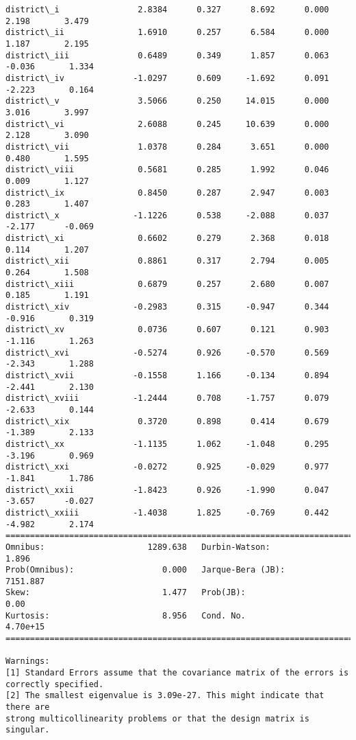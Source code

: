 \documentclass[11pt]{article}
\begin{document}
\begin{Verbatim}[commandchars=\\\{\}]
district\_i                2.8384      0.327      8.692      0.000       2.198       3.479
district\_ii               1.6910      0.257      6.584      0.000       1.187       2.195
district\_iii              0.6489      0.349      1.857      0.063      -0.036       1.334
district\_iv              -1.0297      0.609     -1.692      0.091      -2.223       0.164
district\_v                3.5066      0.250     14.015      0.000       3.016       3.997
district\_vi               2.6088      0.245     10.639      0.000       2.128       3.090
district\_vii              1.0378      0.284      3.651      0.000       0.480       1.595
district\_viii             0.5681      0.285      1.992      0.046       0.009       1.127
district\_ix               0.8450      0.287      2.947      0.003       0.283       1.407
district\_x               -1.1226      0.538     -2.088      0.037      -2.177      -0.069
district\_xi               0.6602      0.279      2.368      0.018       0.114       1.207
district\_xii              0.8861      0.317      2.794      0.005       0.264       1.508
district\_xiii             0.6879      0.257      2.680      0.007       0.185       1.191
district\_xiv             -0.2983      0.315     -0.947      0.344      -0.916       0.319
district\_xv               0.0736      0.607      0.121      0.903      -1.116       1.263
district\_xvi             -0.5274      0.926     -0.570      0.569      -2.343       1.288
district\_xvii            -0.1558      1.166     -0.134      0.894      -2.441       2.130
district\_xviii           -1.2444      0.708     -1.757      0.079      -2.633       0.144
district\_xix              0.3720      0.898      0.414      0.679      -1.389       2.133
district\_xx              -1.1135      1.062     -1.048      0.295      -3.196       0.969
district\_xxi             -0.0272      0.925     -0.029      0.977      -1.841       1.786
district\_xxii            -1.8423      0.926     -1.990      0.047      -3.657      -0.027
district\_xxiii           -1.4038      1.825     -0.769      0.442      -4.982       2.174
==============================================================================
Omnibus:                     1289.638   Durbin-Watson:                   1.896
Prob(Omnibus):                  0.000   Jarque-Bera (JB):             7151.887
Skew:                           1.477   Prob(JB):                         0.00
Kurtosis:                       8.956   Cond. No.                     4.70e+15
==============================================================================

Warnings:
[1] Standard Errors assume that the covariance matrix of the errors is correctly specified.
[2] The smallest eigenvalue is 3.09e-27. This might indicate that there are
strong multicollinearity problems or that the design matrix is singular.

    \end{Verbatim}
\end{document}
